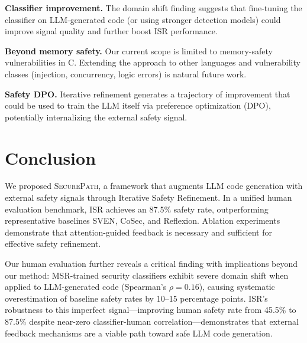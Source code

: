 \documentclass[10pt,conference]{IEEEtran}
\begin{document}
\textbf{Classifier improvement.} The domain shift finding suggests that fine-tuning the classifier on LLM-generated code (or using stronger detection models) could improve signal quality and further boost ISR performance.

\textbf{Beyond memory safety.} Our current scope is limited to memory-safety vulnerabilities in C. Extending the approach to other languages and vulnerability classes (injection, concurrency, logic errors) is natural future work.

\textbf{Safety DPO.} Iterative refinement generates a trajectory of improvement that could be used to train the LLM itself via preference optimization (DPO), potentially internalizing the external safety signal.

\section{Conclusion}

We proposed \textsc{SecurePath}, a framework that augments LLM code generation with external safety signals through Iterative Safety Refinement. In a unified human evaluation benchmark, ISR achieves an 87.5\% safety rate, outperforming representative baselines SVEN, CoSec, and Reflexion. Ablation experiments demonstrate that attention-guided feedback is necessary and sufficient for effective safety refinement.

Our human evaluation further reveals a critical finding with implications beyond our method: MSR-trained security classifiers exhibit severe domain shift when applied to LLM-generated code (Spearman's $\rho=0.16$), causing systematic overestimation of baseline safety rates by 10--15 percentage points. ISR's robustness to this imperfect signal---improving human safety rate from 45.5\% to 87.5\% despite near-zero classifier-human correlation---demonstrates that external feedback mechanisms are a viable path toward safe LLM code generation.




\end{document}
